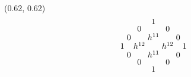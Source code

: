 \begin{frame}
{
    \begin{textblock}{0.4}(0.62, 0.62)
        \[
            \arraycolsep = 1.5pt
            \def\arraystretch{0.7}
            \begin{array}[c]{ccccccc}
                &&& 1                          \\
                &&  0 && 0                     \\
                &   0 && h^{11} && 0           \\
                    1 && h^{12} && h^{12} && 1 \\
                &   0 && h^{11} && 0           \\
                &&  0 && 0                     \\
                &&& 1 
            \end{array}
        \]
    \end{textblock}
}

\end{frame}